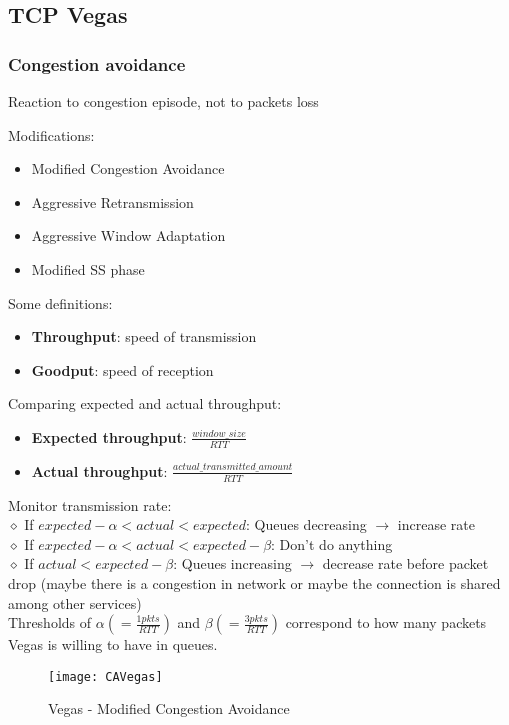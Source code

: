 \subsection{TCP Vegas}

\subsubsection{Congestion avoidance}

Reaction to congestion episode, not to packets loss

Modifications:

\begin{itemize}
  \item Modified Congestion Avoidance
  \item Aggressive Retransmission
  \item Aggressive Window Adaptation
  \item Modified SS phase
\end{itemize}

Some definitions:

\begin{itemize}
  \item \textbf{Throughput}: speed of transmission
  \item \textbf{Goodput}: speed of reception
\end{itemize}

Comparing expected and actual throughput:

\begin{itemize}
  \item \textbf{Expected throughput}: $\frac{window\_size}{RTT}$
  \item \textbf{Actual throughput}: $\frac{actual\_transmitted\_amount}{RTT}$
\end{itemize}

Monitor transmission rate: \\

$\diamond$ If $expected - \alpha < actual < expected$:
Queues decreasing $\rightarrow$ increase rate \\

$\diamond$ If $expected - \alpha < actual < expected - \beta$:
Don’t do anything \\

$\diamond$ If $actual < expected - \beta$:
Queues increasing $\rightarrow$ decrease rate before packet drop (maybe there
is a congestion in network or maybe the connection is shared among other
services) \\

Thresholds of $\alpha (= \frac{1 pkts}{RTT})$ and $\beta (= \frac{3 pkts}{RTT})$ correspond to how many packets 
Vegas is willing to have in queues.

\begin{figure}[H]
  \texttt{[image: CAVegas]}
  \caption{Vegas - Modified Congestion Avoidance}
\end{figure}




